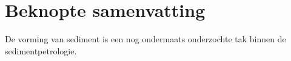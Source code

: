 \chapter{Beknopte samenvatting}

De vorming van sediment is een nog ondermaats onderzochte tak binnen de sedimentpetrologie. %



\instructionsabstract

\cleardoublepage

